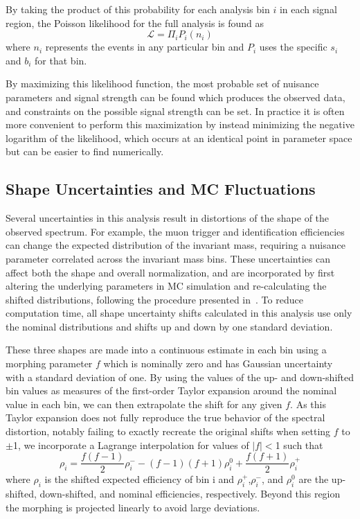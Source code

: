 By taking the product of this probability for each analysis bin $i$ in each signal region, the Poisson likelihood for the full analysis is found as
\begin{equation}
	\mathcal{L} = \Pi_{i} P_i (n_i)
\end{equation}
where $n_i$ represents the events in any particular bin and $P_i$ uses the specific $s_i$ and $b_i$ for that bin.

By maximizing this likelihood function, the most probable set of nuisance parameters and signal strength can be found which produces the observed data, and constraints on the possible signal strength can be set.
In practice it is often more convenient to perform this maximization by instead minimizing the negative logarithm of the likelihood, which occurs at an identical point in parameter space but can be easier to find numerically.

\subsection{Shape Uncertainties and MC Fluctuations}
Several uncertainties in this analysis result in distortions of the shape of the observed spectrum. 
For example, the muon trigger and identification efficiencies can change the expected distribution of the invariant mass, requiring a nuisance parameter correlated across the invariant mass bins.
These uncertainties can affect both the shape and overall normalization, and are incorporated by first altering the underlying parameters in MC simulation and re-calculating the shifted distributions, following the procedure presented in~\cite{conway2011}.
To reduce computation time, all shape uncertainty shifts calculated in this analysis use only the nominal distributions and shifts up and down by one standard deviation.

These three shapes are made into a continuous estimate in each bin using a morphing parameter $f$ which is nominally zero and has Gaussian uncertainty with a standard deviation of one.
By using the values of the up- and down-shifted bin values as measures of the first-order Taylor expansion around the nominal value in each bin, we can then extrapolate the shift for any given $f$. 
As this Taylor expansion does not fully reproduce the true behavior of the spectral distortion, notably failing to exactly recreate the original shifts when setting $f$ to $\pm$1, we incorporate a Lagrange interpolation for values of $|f|<$1 such that
\begin{equation}
	\rho_i = \frac{f(f-1)}{2}\rho_{i}^{-} - (f-1)(f+1)\rho_{i}^0 + \frac{f(f+1)}{2}\rho_{i}^{+}
\end{equation}
where $\rho_i$ is the shifted expected efficiency of bin i and $\rho_{i}^+$,$\rho_{i}^-$, and $\rho_{i}^0$ are the up-shifted, down-shifted, and nominal efficiencies, respectively.
Beyond this region the morphing is projected linearly to avoid large deviations. 

